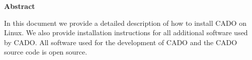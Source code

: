 
\clearemptydoublepage
{}
{}	





\vspace*{2cm}
\begin{center}
{\Large \bf Abstract}
\end{center}
\vspace{1cm}
In this document we provide a detailed description of how to install CADO on Linux. We also provide installation instructions for all additional software used by CADO. All software used for the development of CADO and the CADO source code is open source.

